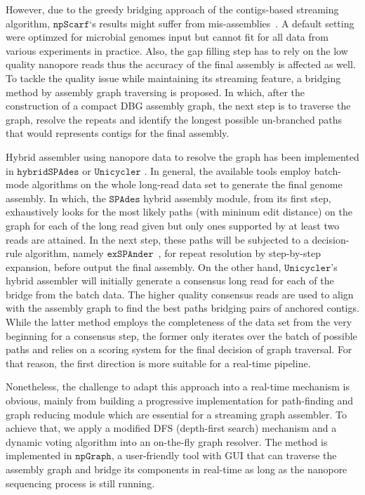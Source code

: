 \documentclass[10pt,twocolumn,twoside]{genpaper}
\newcommand{\npscarf}{$\mathtt{npScarf}$}
\newcommand{\npgraph}{$\mathtt{npGraph}$}
\newcommand{\unicycler}{$\mathtt{Unicycler}$}
\newcommand{\spades}{$\mathtt{SPAdes}$}
\begin{document}
However, due to the greedy bridging approach of the contigs-based streaming algorithm, \npscarf{}`s results might suffer from mis-assemblies~\cite{Wick2017unicycler,Giordano2017}. 
A default setting were optimzed for microbial genomes input but cannot fit for all data from various experiments in practice.
Also, the gap filling step has to rely on the low quality nanopore reads thus the accuracy of the final assembly is affected as well. 
To tackle the quality issue while maintaining its streaming feature, a bridging method by assembly graph traversing is proposed. 
In which, after the construction of a compact DBG assembly graph, the next step is to traverse the graph, resolve the repeats and identify the longest possible un-branched paths that would represents contigs for the final assembly.

Hybrid assembler using nanopore data to resolve the graph has been implemented in $\mathtt{hybridSPAdes}$ \cite{AntipovKM2015} or \unicycler{} \cite{Wick2017unicycler}. 
In general, the available tools employ batch-mode algorithms on the whole long-read data set to generate the final genome assembly. 
In which, the \spades{} hybrid assembly module, from its first step, exhaustively looks for the most likely paths (with mininum edit distance) on the graph for each of the long read given but only ones supported by at least two reads are attained. In the next step, these paths will be subjected to a decision-rule algorithm, namely $\mathtt{exSPAnder}$~\cite{Prjibelski2014}, for repeat resolution by step-by-step expansion, before output the final assembly.
On the other hand, \unicycler{}'s hybrid assembler will initially generate a consensus long read for each of the bridge from the batch data. 
The higher quality consensus reads are used to align with the assembly graph to find the best paths bridging pairs of anchored contigs.
While the latter method employs the completeness of the data  set from the very beginning for a consensus step, the former only iterates over the batch of possible paths and relies on a scoring system for the final decision of graph traversal. For that reason, the first direction is more suitable for a real-time pipeline.
    
Nonetheless, the challenge to adapt this approach into a real-time mechanism is obvious, mainly from building a progressive implementation for path-finding and graph reducing module which are essential for a streaming graph assembler. 
To achieve that, we apply a modified DFS (depth-first search) mechanism and a dynamic voting algorithm into an on-the-fly graph resolver.
The method is implemented in \npgraph{}, a user-friendly tool with GUI that can traverse the assembly graph and bridge its components in real-time as long as the nanopore sequencing process is still running. 
 
\end{document}
